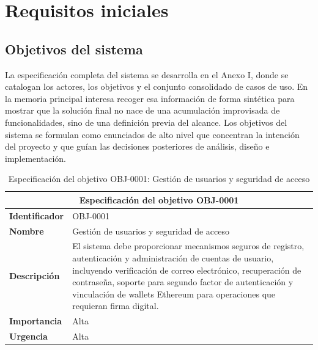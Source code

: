 \documentclass[11pt, a4paper]{article}
\begin{document}
\section{Requisitos iniciales}

\subsection{Objetivos del sistema}

La especificación completa del sistema se desarrolla en el Anexo I, donde se catalogan los actores, los objetivos y el conjunto consolidado de casos de uso. En la memoria principal interesa recoger esa información de forma sintética para mostrar que la solución final no nace de una acumulación improvisada de funcionalidades, sino de una definición previa del alcance. Los objetivos del sistema se formulan como enunciados de alto nivel que concentran la intención del proyecto y que guían las decisiones posteriores de análisis, diseño e implementación.

\begin{table}[H]
    \centering
    \small
    \begin{tabular}{|p{4cm}|p{9cm}|}
    \hline
    \multicolumn{2}{|c|}{\textbf{Especificación del objetivo OBJ-0001}} \\
    \hline
    \textbf{Identificador} & OBJ-0001 \\
    \hline
    \textbf{Nombre} & Gestión de usuarios y seguridad de acceso \\
    \hline
    \textbf{Descripción} & El sistema debe proporcionar mecanismos seguros de registro, autenticación y administración de cuentas de usuario, incluyendo verificación de correo electrónico, recuperación de contraseña, soporte para segundo factor de autenticación y vinculación de wallets Ethereum para operaciones que requieran firma digital. \\
    \hline
    \textbf{Importancia} & Alta \\
    \hline
    \textbf{Urgencia} & Alta \\
    \hline
    \end{tabular}
    \caption{Especificación del objetivo OBJ-0001: Gestión de usuarios y seguridad de acceso}
    \label{tab:obj-0001}
\end{table}
\end{document}
